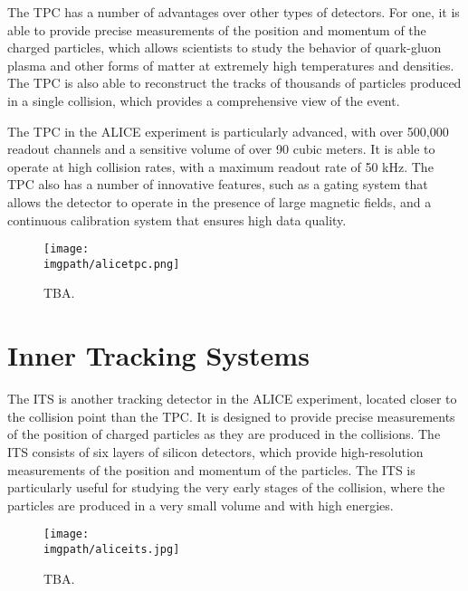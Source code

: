 The TPC has a number of advantages over other types of detectors. For one, it is able to provide precise measurements of the position and momentum of the charged particles, which allows scientists to study the behavior of quark-gluon plasma and other forms of matter at extremely high temperatures and densities. The TPC is also able to reconstruct the tracks of thousands of particles produced in a single collision, which provides a comprehensive view of the event.

The TPC in the ALICE experiment is particularly advanced, with over 500,000 readout channels and a sensitive volume of over 90 cubic meters. It is able to operate at high collision rates, with a maximum readout rate of 50 kHz. The TPC also has a number of innovative features, such as a gating system that allows the detector to operate in the presence of large magnetic fields, and a continuous calibration system that ensures high data quality.


\begin{figure}%
\centering%
\texttt{[image: \\imgpath/alicetpc.png]}
\caption{TBA.}
\label{fig:experiment:cern}
\end{figure}


\section{Inner Tracking Systems}

The ITS is another tracking detector in the ALICE experiment, located closer to the collision point than the TPC. It is designed to provide precise measurements of the position of charged particles as they are produced in the collisions. The ITS consists of six layers of silicon detectors, which provide high-resolution measurements of the position and momentum of the particles. The ITS is particularly useful for studying the very early stages of the collision, where the particles are produced in a very small volume and with high energies.


\begin{figure}%
\centering%
\texttt{[image: \\imgpath/aliceits.jpg]}
\caption{TBA.}
\label{fig:experiment:cern}
\end{figure}
